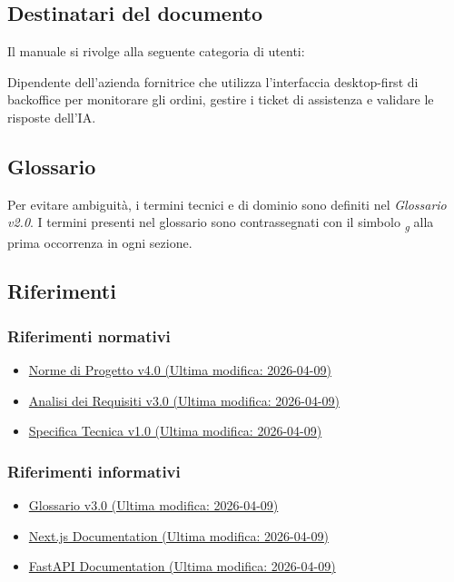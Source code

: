 \subsection{Destinatari del documento}
Il manuale si rivolge alla seguente categoria di utenti:

\begin{description}[style=nextline]
    \item[\textbf{Operatore}] Dipendente dell'azienda fornitrice che utilizza l'interfaccia desktop-first di backoffice per monitorare gli ordini, gestire i ticket di assistenza e validare le risposte dell'IA.
\end{description}

\subsection{Glossario}
Per evitare ambiguit\`a, i termini tecnici e di dominio sono definiti nel \textit{Glossario v2.0}.
I termini presenti nel glossario sono contrassegnati con il simbolo \textsubscript{\textit{g}} alla prima occorrenza in ogni sezione.

\subsection{Riferimenti}

\subsubsection{Riferimenti normativi}
\begin{itemize}
    \item \href{https://swenightpro.github.io/Documentazione/docs/PB/Documentazione\%20Interna/Norme_Di_Progetto.pdf}{Norme di Progetto v4.0 (Ultima modifica: 2026-04-09)}
    \item \href{https://swenightpro.github.io/Documentazione/docs/PB/Documentazione\%20Esterna/Analisi_Dei_Requisiti.pdf}{Analisi dei Requisiti v3.0 (Ultima modifica: 2026-04-09)}
    \item \href{https://swenightpro.github.io/Documentazione/docs/PB/Documentazione\%20Esterna/Specifica_Tecnica.pdf}{Specifica Tecnica v1.0 (Ultima modifica: 2026-04-09)}
\end{itemize}

\subsubsection{Riferimenti informativi}
\begin{itemize}
    \item \href{https://swenightpro.github.io/Documentazione/docs/PB/Documentazione\%20Esterna/Glossario.pdf}{Glossario v3.0 (Ultima modifica: 2026-04-09)}
    \item \href{https://nextjs.org/docs}{Next.js Documentation (Ultima modifica: 2026-04-09)}
    \item \href{https://fastapi.tiangolo.com}{FastAPI Documentation (Ultima modifica: 2026-04-09)}
\end{itemize}